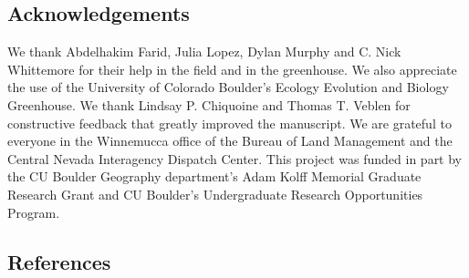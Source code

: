 \documentclass[
  12pt,
]{article}
\begin{document}
\hypertarget{acknowledgements}{%
\subsection{Acknowledgements}\label{acknowledgements}}

We thank Abdelhakim Farid, Julia Lopez, Dylan Murphy and C. Nick
Whittemore for their help in the field and in the greenhouse. We also
appreciate the use of the University of Colorado Boulder's Ecology
Evolution and Biology Greenhouse. We thank Lindsay P. Chiquoine and
Thomas T. Veblen for constructive feedback that greatly improved the
manuscript. We are grateful to everyone in the Winnemucca office of the
Bureau of Land Management and the Central Nevada Interagency Dispatch
Center. This project was funded in part by the CU Boulder Geography
department's Adam Kolff Memorial Graduate Research Grant and CU
Boulder's Undergraduate Research Opportunities Program.

\hypertarget{references}{%
\subsection{References}\label{references}}
\end{document}
